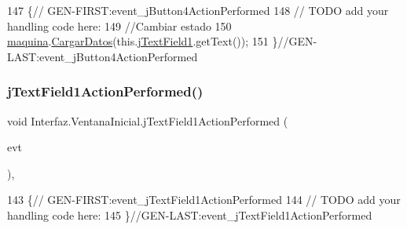 \begin{DoxyCode}
147                                                                          \{\textcolor{comment}{//
      GEN-FIRST:event\_jButton4ActionPerformed}
148         \textcolor{comment}{// TODO add your handling code here:}
149         \textcolor{comment}{//Cambiar estado}
150         \mbox{\hyperlink{class_interfaz_1_1_ventana_inicial_a906577f94c1548333c5f598012939378}{maquina}}.\mbox{\hyperlink{classalgoritmia2_1_1_algoritmos_ab5d2d8385a30626622b05e83e9c1cd41}{CargarDatos}}(this.\mbox{\hyperlink{class_interfaz_1_1_ventana_inicial_a45365129af4acf435140853b35aec365}{jTextField1}}.getText());
151     \}\textcolor{comment}{//GEN-LAST:event\_jButton4ActionPerformed}
\end{DoxyCode}
\mbox{\label{class_interfaz_1_1_ventana_inicial_a9c3c5c3a37751a96caad2531a6c8faf5}} 
\subsubsection{\texorpdfstring{j\+Text\+Field1\+Action\+Performed()}{jTextField1ActionPerformed()}}
{\footnotesize\ttfamily void Interfaz.\+Ventana\+Inicial.\+j\+Text\+Field1\+Action\+Performed (\begin{DoxyParamCaption}\item[{java.\+awt.\+event.\+Action\+Event}]{evt }\end{DoxyParamCaption})\hspace{0.3cm}{\ttfamily [inline]}, {\ttfamily [private]}}


\begin{DoxyCode}
143                                                                             \{\textcolor{comment}{//
      GEN-FIRST:event\_jTextField1ActionPerformed}
144         \textcolor{comment}{// TODO add your handling code here:}
145     \}\textcolor{comment}{//GEN-LAST:event\_jTextField1ActionPerformed}
\end{DoxyCode}
\mbox{\label{class_interfaz_1_1_ventana_inicial_a19f3f67512433e3d4612705cc49430ad}} 
